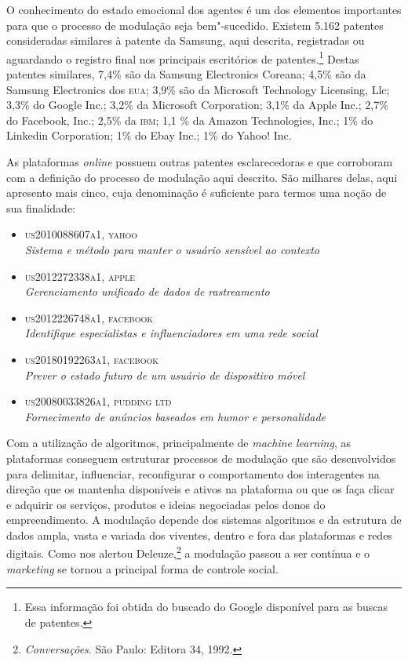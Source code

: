 O conhecimento do estado emocional dos agentes é um dos elementos
importantes para que o processo de modulação seja bem"-sucedido. Existem
5.162 patentes consideradas similares à patente da Samsung, aqui
descrita, registradas ou aguardando o registro final nos principais
escritórios de patentes.\footnote{Essa informação foi obtida do buscado
  do Google disponível para as buscas de patentes.} Destas patentes
similares, 7,4\% são da Samsung Electronics Coreana; 4,5\% são da
Samsung Electronics dos \textsc{eua}; 3,9\% são da Microsoft Technology
Licensing, Llc; 3,3\% do Google Inc.; 3,2\% da Microsoft Corporation;
3,1\% da Apple Inc.; 2,7\% do Facebook, Inc.; 2,5\% da \textsc{ibm}; 1,1 \% da
Amazon Technologies, Inc.; 1\% do Linkedin Corporation; 1\% do Ebay
Inc.; 1\% do Yahoo! Inc.

As plataformas \emph{online} possuem outras patentes esclarecedoras e que
corroboram com a definição do processo de modulação aqui descrito. São
milhares delas, aqui apresento mais cinco, cuja denominação é suficiente
para termos uma noção de sua finalidade:

\begin{itemize}
\item
  \textsc{us2010088607a1, yahoo}\\
  \textit{Sistema e método para manter o usuário sensível ao contexto}
\item
  \textsc{us2012272338a1, apple}\\
  \textit{Gerenciamento unificado de dados de rastreamento}
\item
  \textsc{us2012226748a1, facebook}\\
  \emph{Identifique especialistas e influenciadores em uma rede social}
\item
  \textsc{us20180192263a1, facebook}\\
  \emph{Prever o estado futuro de um usuário de dispositivo móvel}
\item
  \textsc{us20080033826a1, pudding ltd}\\
  \emph{Fornecimento de anúncios baseados em humor e personalidade}
\end{itemize}

Com a utilização de algoritmos, principalmente de \emph{machine
learning}, as plataformas conseguem estruturar processos de modulação
que são desenvolvidos para delimitar, influenciar, reconfigurar o
comportamento dos interagentes na direção que os mantenha disponíveis e
ativos na plataforma ou que os faça clicar e adquirir os serviços,
produtos e ideias negociadas pelos donos do empreendimento. A modulação
depende dos sistemas algoritmos e da estrutura de dados ampla, vasta e
variada dos viventes, dentro e fora das plataformas e redes digitais.
Como nos alertou Deleuze,\footnote{\emph{Conversações}. São Paulo:
Editora 34, 1992.} a modulação passou a ser contínua e o
\emph{marketing} se tornou a principal forma de controle social.

